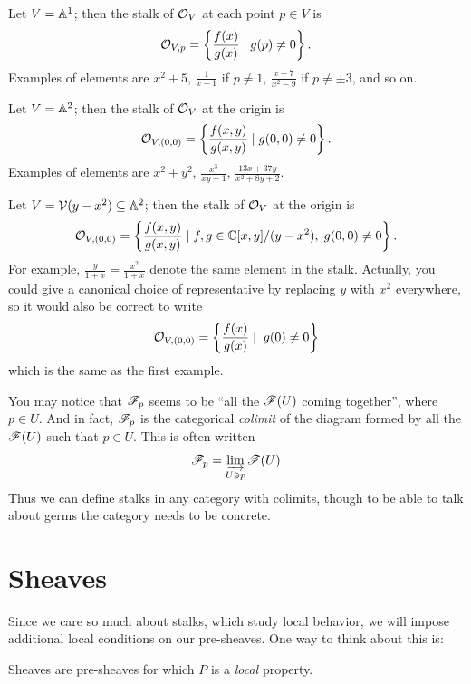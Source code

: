 \begin{example}
	\listhack
	\begin{enumerate}[(a)]
		\ii Let $V = \mathbb A^1$; then the stalk of $\mathcal O_V$
		at each point $p \in V$ is
		\[ \mathcal O_{V,p}
			= \left\{ \frac{f(x)}{g(x)} \mid g(p) \neq 0 \right\}. \]
		Examples of elements are $x^2+5$, $\frac{1}{x-1}$ if $p \neq 1$,
		$\frac{x+7}{x^2-9}$ if $p \neq \pm 3$, and so on.

		\ii Let $V = \mathbb A^2$;
		then the stalk of $\mathcal O_V$ at the origin is
		\[ \mathcal O_{V, (0,0)}
			= \left\{ \frac{f(x,y)}{g(x,y)} \mid g(0,0) \neq 0 \right\}. \]
		Examples of elements are $x^2+y^2$,
		$\frac{x^3}{xy+1}$, $\frac{13x+37y}{x^2+8y+2}$.

		\ii Let $V = \mathcal V(y-x^2) \subseteq \mathbb A^2$;
		then the stalk of $\mathcal O_V$ at the origin is
		\[ \mathcal O_{V, (0,0)}
			= \left\{ \frac{f(x,y)}{g(x,y)} \mid f,g \in \mathbb C[x,y] / (y-x^2),
				\; g(0,0) \neq 0 \right\}. \]
		For example, $\frac{y}{1+x} = \frac{x^2}{1+x}$
		denote the same element in the stalk.
		Actually, you could give a canonical choice of representative
		by replacing $y$ with $x^2$ everywhere, so it would also be
		correct to write
		\[ \mathcal O_{V, (0,0)}
			= \left\{ \frac{f(x)}{g(x)} \mid \; g(0) \neq 0 \right\} \]
		which is the same as the first example.
	\end{enumerate}
\end{example}

\begin{remark}
	You may notice that $\mathscr F_p$ seems to be
	``all the $\mathscr F(U)$ coming together'', where $p \in U$.
	And in fact, $\mathscr F_p$ is the categorical \emph{colimit}
	of the diagram formed by all the $\mathscr F(U)$ such that $p \in U$.
	This is often written
	\[ \mathscr F_p = \varinjlim_{U \ni p} \mathscr F(U) \]
	Thus we can define stalks in any category with colimits,
	though to be able to talk about germs the category needs
	to be concrete.
\end{remark}

\section{Sheaves}

Since we care so much about stalks, which study local behavior,
we will impose additional local conditions on our pre-sheaves.
One way to think about this is:
\begin{moral}
	Sheaves are pre-sheaves for which $P$ is a \emph{local} property.
\end{moral}

